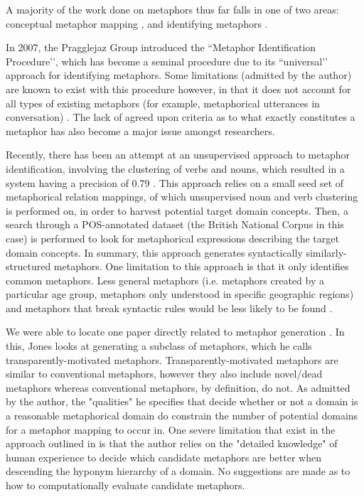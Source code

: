 \documentclass[12pt]{article}
\begin{document}
A majority of the work done on metaphors thus far falls in one of two areas: conceptual metaphor mapping \cite{lakoff80} \cite{lakoff89}, and identifying metaphors \cite{shutova101} \cite{pragglejaz}.

In 2007, the Pragglejaz Group introduced the ``Metaphor Identification Procedure’’, which has become a seminal procedure due to its ``universal’’ approach for identifying metaphors. Some limitations (admitted by the author) are known to exist with this procedure however, in that it does not account for all types of existing metaphors (for example, metaphorical utterances in conversation) \cite{pragglejaz}. The lack of agreed upon criteria as to what exactly constitutes a metaphor has also become a major issue amongst researchers.

Recently, there has been an attempt at an unsupervised approach to metaphor identification, involving the clustering of verbs and nouns, which resulted in a system having a precision of 0.79 \cite{shutova101}. This approach relies on a small seed set of metaphorical relation mappings, of which unsupervised noun and verb clustering is performed on, in order to harvest potential target domain concepts. Then, a search through a POS-annotated dataset (the British National Corpus in this case) is performed to look for metaphorical expressions describing the target domain concepts. In summary, this approach generates syntactically similarly-structured metaphors. One limitation to this approach is that it only identifies common metaphors. Less general metaphors (i.e. metaphors created by a particular age group, metaphors only understood in specific geographic regions) and metaphors that break syntactic rules would be less likely to be found \cite{gentner01}.

We were able to locate one paper directly related to metaphor generation \cite{jones92}. In this, Jones looks at generating a subclass of metaphors, which he calls transparently-motivated metaphors. Transparently-motivated metaphors are similar to conventional metaphors, however they also include novel/dead metaphors whereas conventional metaphors, by definition, do not. As admitted by the author, the "qualities" he specifies that decide whether or not a domain is a reasonable metaphorical domain do constrain the number of potential domains for a metaphor mapping to occur in. One severe limitation that exist in the approach outlined in \cite{jones92} is that the author relies on the "detailed knowledge" of human experience to decide which candidate metaphors are better when descending the hyponym hierarchy of a domain. No suggestions are made as to how to computationally evaluate candidate metaphors.
\end{document}
